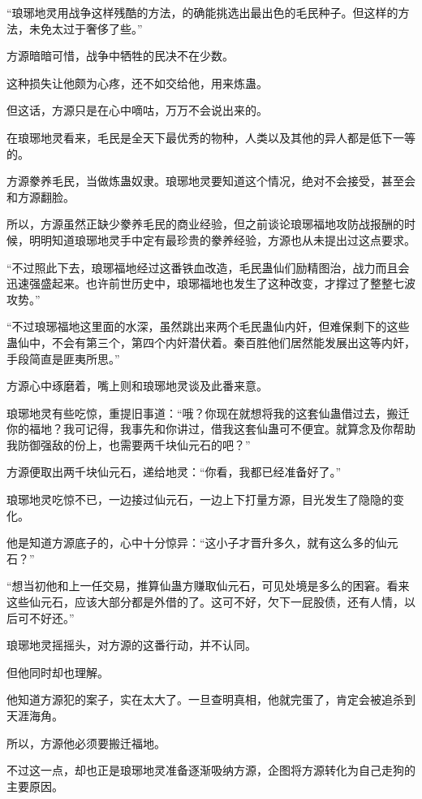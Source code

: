 \begin{this_body}
“琅琊地灵用战争这样残酷的方法，的确能挑选出最出色的毛民种子。但这样的方法，未免太过于奢侈了些。”

方源暗暗可惜，战争中牺牲的民决不在少数。

这种损失让他颇为心疼，还不如交给他，用来炼蛊。

但这话，方源只是在心中嘀咕，万万不会说出来的。

在琅琊地灵看来，毛民是全天下最优秀的物种，人类以及其他的异人都是低下一等的。

方源豢养毛民，当做炼蛊奴隶。琅琊地灵要知道这个情况，绝对不会接受，甚至会和方源翻脸。

所以，方源虽然正缺少豢养毛民的商业经验，但之前谈论琅琊福地攻防战报酬的时候，明明知道琅琊地灵手中定有最珍贵的豢养经验，方源也从未提出过这点要求。

“不过照此下去，琅琊福地经过这番铁血改造，毛民蛊仙们励精图治，战力而且会迅速强盛起来。也许前世历史中，琅琊福地也发生了这种改变，才撑过了整整七波攻势。”

“不过琅琊福地这里面的水深，虽然跳出来两个毛民蛊仙内奸，但难保剩下的这些蛊仙中，不会有第三个，第四个内奸潜伏着。秦百胜他们居然能发展出这等内奸，手段简直是匪夷所思。”

方源心中琢磨着，嘴上则和琅琊地灵谈及此番来意。

琅琊地灵有些吃惊，重提旧事道：“哦？你现在就想将我的这套仙蛊借过去，搬迁你的福地？我可记得，我事先和你讲过，借我这套仙蛊可不便宜。就算念及你帮助我防御强敌的份上，也需要两千块仙元石的吧？”

方源便取出两千块仙元石，递给地灵：“你看，我都已经准备好了。”

琅琊地灵吃惊不已，一边接过仙元石，一边上下打量方源，目光发生了隐隐的变化。

他是知道方源底子的，心中十分惊异：“这小子才晋升多久，就有这么多的仙元石？”

“想当初他和上一任交易，推算仙蛊方赚取仙元石，可见处境是多么的困窘。看来这些仙元石，应该大部分都是外借的了。这可不好，欠下一屁股债，还有人情，以后可不好还。”

琅琊地灵摇摇头，对方源的这番行动，并不认同。

但他同时却也理解。

他知道方源犯的案子，实在太大了。一旦查明真相，他就完蛋了，肯定会被追杀到天涯海角。

所以，方源他必须要搬迁福地。

不过这一点，却也正是琅琊地灵准备逐渐吸纳方源，企图将方源转化为自己走狗的主要原因。


\end{this_body}
